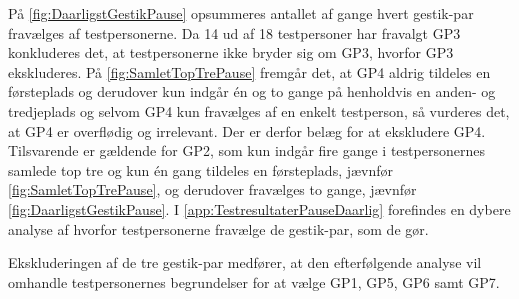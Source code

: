 På \autoref{fig:DaarligstGestikPause} opsummeres antallet af gange hvert gestik-par fravælges af testpersonerne. Da 14 ud af 18 testpersoner har fravalgt GP3 konkluderes det, at testpersonerne ikke bryder sig om GP3, hvorfor GP3 ekskluderes. På \autoref{fig:SamletTopTrePause} fremgår det, at GP4 aldrig tildeles en førsteplads og derudover kun indgår én og to gange på henholdvis en anden- og tredjeplads og selvom GP4 kun fravælges af en enkelt testperson, så vurderes det, at GP4 er overflødig og irrelevant. Der er derfor belæg for at ekskludere GP4. Tilsvarende er gældende for GP2, som kun indgår fire gange i testpersonernes samlede top tre og kun én gang tildeles en førsteplads, jævnfør \autoref{fig:SamletTopTrePause}, og derudover fravælges to gange, jævnfør \autoref{fig:DaarligstGestikPause}. I \autoref{app:TestresultaterPauseDaarlig} forefindes en dybere analyse af hvorfor testpersonerne fravælge de gestik-par, som de gør.

Ekskluderingen af de tre gestik-par medfører, at den efterfølgende analyse vil omhandle testpersonernes begrundelser for at vælge GP1, GP5, GP6 samt GP7.
%

